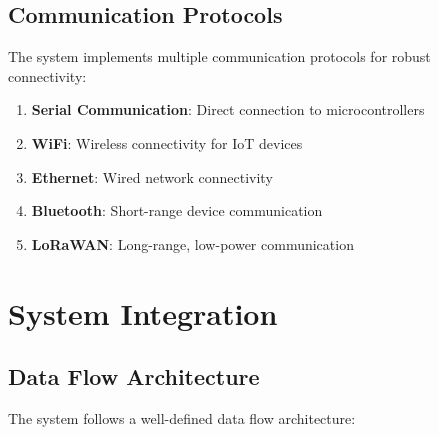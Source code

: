 \subsection{Communication Protocols}

The system implements multiple communication protocols for robust connectivity:

\begin{enumerate}
    \item \textbf{Serial Communication}: Direct connection to microcontrollers
    \item \textbf{WiFi}: Wireless connectivity for IoT devices
    \item \textbf{Ethernet}: Wired network connectivity
    \item \textbf{Bluetooth}: Short-range device communication
    \item \textbf{LoRaWAN}: Long-range, low-power communication
\end{enumerate}

\section{System Integration}

\subsection{Data Flow Architecture}

The system follows a well-defined data flow architecture:

